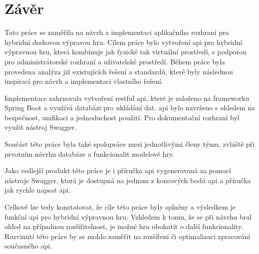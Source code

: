 \chapter{Závěr}
Tato práce se zaměřila na návrh a implementaci aplikačního rozhraní pro hybridní deskovou výpravou hru. Cílem práce bylo vytvoření \gls{api} pro hybridní výpravnou hru, která kombinuje jak fyzické tak virtuální prostředí, s podporou pro administrátorské rozhraní a uživatelské prostředí. Během práce byla provedena analýza již existujících řešení a standardů, které byly následnou inspirací pro návrh a implementaci vlastního řešení.

Implementace zahrnovala vytvoření \gls{restful api}, které je založeno na \gls{framework}u Spring Boot a využívá databázi pro ukládání dat. \gls{api} bylo navrženo s ohledem na bezpečnost, unifikaci a jednoduchost použití. Pro dokumentační rozhraní byl využit nástroj Swagger.

Součást této práce byla také spolupráce mezi jednotlivými členy týmu, zvláště při prvotním návrhu databáze a funkcionalit modelové hry.

Jako vedlejší produkt této práce je i příručka \gls{api} vygenerovaná za pomocí nástroje Swagger, která je dostupná na jednom z koncových bodů \gls{api} a příručka jak rychle napsat \gls{api}.

Celkově lze tedy konstatovat, že cíle této práce byly splněny a výsledkem je funkční \gls{api} pro hybridní výpravnou hru. Vzhledem k tomu, že se při návrhu bral ohled na případnou rozšiřitelnost, je možné hru obohatit o další funkcionality. Rozvinutí této práce by se mohlo zaměřit na rozšíření či optimalizaci zpracování současného \gls{api}.

\endinput